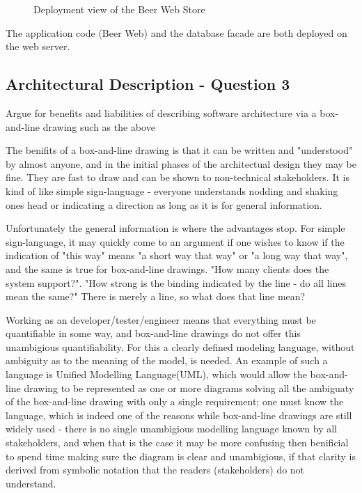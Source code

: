 \begin{figure}[!htb]
\centerline{}
\caption{Deployment view of the Beer Web Store}
\label{fig:ad_allocation}
\end{figure}

The application code (Beer Web) and the database facade are
both deployed on the web server.

\subsection{Architectural Description - Question 3}

\begin{question}
Argue for benefits and liabilities of describing software
architecture via a box-and-line drawing such as the above
\end{question}

The benifits of a box-and-line drawing is that it can be written and "understood" by almost anyone, and in the initial phases of the architectual design they may be fine. They are fast to draw and can be shown to non-technical stakeholders. It is kind of like simple sign-language - everyone understands nodding and shaking ones head or indicating a direction as long as it is for general information.

Unfortunately the general information is where the advantages stop. For simple sign-language, it may quickly come to an argument if one wishes to know if the indication of "this way" means "a short way that way" or "a long way that way", and the same is true for box-and-line drawings. "How many clients does the system support?". "How strong is the binding indicated by the line - do all lines mean the same?" There is merely a line, so what does that line mean?

Working as an developer/tester/engineer means that everything must be quantifiable in some way, and box-and-line drawings do not offer this unambigious quantifiability. For this a clearly defined modeling language, without ambiguity as to the meaning of the model, is needed. An example of such a language is Unified Modelling Language(UML), which would allow the box-and-line drawing to be represented as one or more diagrams solving all the ambiguaty of the box-and-line drawing with only a single requirement; one must know the language, which is indeed one of the reasons while box-and-line drawings are still widely used - there is no single unambigious modelling language known by all stakeholders, and when that is the case it may be more confusing then benificial to spend time making sure the diagram is clear and unambigious, if that clarity is derived from symbolic notation that the readers (stakeholders) do not understand.


